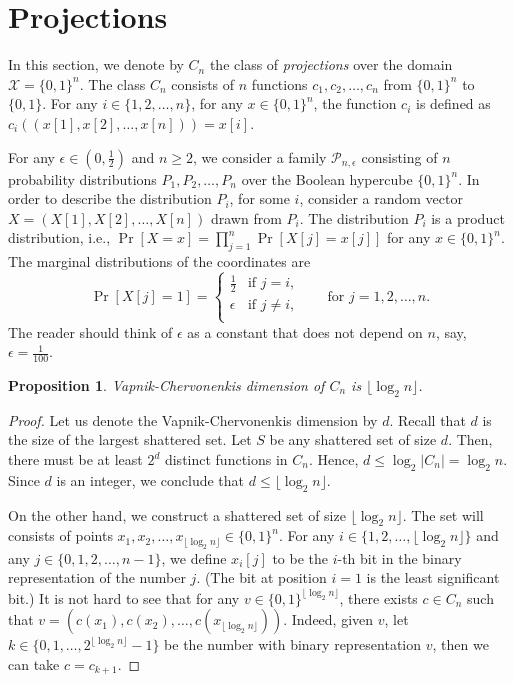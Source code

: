 \documentclass[11pt]{article}
\newtheorem{proposition}{Proposition}
\renewcommand{\P}{\mathcal{P}}
\newcommand{\X}{\mathcal{X}}
\begin{document}
\section{Projections}
\label{section:projections}

In this section, we denote by $C_n$ the class of \emph{projections} over the
domain $\X = \{0,1\}^n$. The class $C_n$ consists of $n$ functions $c_1, c_2,
\dots, c_n$ from $\{0,1\}^n$ to $\{0,1\}$. For any $i \in \{1,2,\dots,n\}$, for
any $x \in \{0,1\}^n$, the function $c_i$ is defined as $c_i((x[1], x[2], \dots,
x[n])) = x[i]$.

For any $\epsilon \in (0,\frac{1}{2})$ and $n \ge 2$, we consider a family
$\P_{n,\epsilon}$ consisting of $n$ probability distributions $P_1, P_2, \dots,
P_n$ over the Boolean hypercube $\{0,1\}^n$. In order to describe the
distribution $P_i$, for some $i$, consider a random vector $X = (X[1], X[2],
\dots, X[n])$ drawn from $P_i$. The distribution $P_i$ is a product
distribution, i.e., $\Pr[X = x] = \prod_{j=1}^n \Pr[X[j] = x[j]]$ for any $x \in
\{0,1\}^n$. The marginal distributions of the coordinates are
$$
\Pr[X[j] = 1] =
\begin{cases}
\frac{1}{2} & \text{if $j = i$,} \\
\epsilon & \text{if $j\neq i$,} \\
\end{cases}
\qquad \text{for $j=1,2,\dots,n$.}
$$
The reader should think of $\epsilon$ as a constant that does not depend on $n$,
say, $\epsilon=\frac{1}{100}$.

\begin{proposition}
\label{proposition:vc-dimension-projections}
Vapnik-Chervonenkis dimension of $C_n$ is $\lfloor \log_2 n \rfloor$.
\end{proposition}

\begin{proof}
Let us denote the Vapnik-Chervonenkis dimension by $d$. Recall that $d$ is the
size of the largest shattered set. Let $S$ be any shattered set of size $d$.
Then, there must be at least $2^d$ distinct functions in $C_n$. Hence, $d \le
\log_2 |C_n| = \log_2 n$. Since $d$ is an integer, we conclude that $d \le
\lfloor \log_2 n \rfloor$.

On the other hand, we construct a shattered set of size $\lfloor \log_2 n
\rfloor$. The set will consists of points $x_1, x_2, \dots, x_{\lfloor \log_2 n
\rfloor} \in \{0,1\}^n$. For any $i \in \{1,2,\dots,\lfloor \log_2 n \rfloor\}$
and any $j \in \{0,1,2,\dots,n-1\}$, we define $x_i[j]$ to be the $i$-th bit
in the binary representation of the number $j$. (The bit at position $i=1$ is the
least significant bit.) It is not hard to see that for any $v \in
\{0,1\}^{\lfloor \log_2 n \rfloor}$, there exists $c \in C_n$ such that $v =
(c(x_1), c(x_2), \dots, c(x_{\lfloor \log_2 n \rfloor}))$. Indeed, given $v$,
let $k \in \{0,1,\dots,2^{\lfloor \log_2 n \rfloor} - 1\}$ be the number with
binary representation $v$, then we can take $c = c_{k+1}$.
\end{proof}
\end{document}
